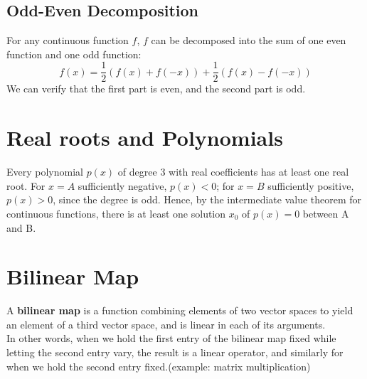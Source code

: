 \documentclass[11pt]{article}
\newcommand{\tb}[1]{\textbf{#1}}
\begin{document}
\subsection{Odd-Even Decomposition}
For any continuous function $f$, $f$ can be decomposed into the sum of one even function and one odd function:
$$f(x) = \frac{1}{2}(f(x) + f(-x)) + \frac{1}{2}(f(x) - f(-x))$$
We can verify that the first part is even, and the second part is odd.
\section{Real roots and Polynomials}
Every polynomial $p(x)$ of degree 3 with real coefficients has at least one real root. For $x = A$ sufficiently negative, $p(x) < 0$; for $x = B$ sufficiently positive, $p(x) > 0$, since the degree is odd. Hence, by the intermediate value theorem for continuous functions, there is at least one solution $x_0$ of $p(x) = 0$ between A and B.
\section{Bilinear Map}
A \tb{bilinear map} is a function combining elements of two vector spaces to yield an element of a third vector space, and is linear in each of its arguments. \\
In other words, when we hold the first entry of the bilinear map fixed while letting the second entry vary, the result is a linear operator, and similarly for when we hold the second entry fixed.(example: matrix multiplication)
\end{document}
